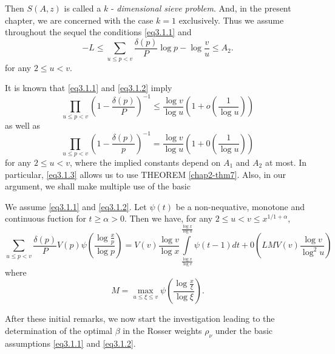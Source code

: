 Then $S(A,z)$ is called a $k$ - \textit{dimensional sieve
  problem}. And, in the present chapter, we are concerned with the
case $k =1$ exclusively. Thus we assume throughout the sequel the
conditions \eqref{eq3.1.1} and  
\begin{equation*}
 -L \le \sum_{u \le p < v} \frac{\delta(p)}{P} \log p - \log
 \frac{v}{u} \le A_2. \tag{3.1.2} \label{eq3.1.2}
\end{equation*}
for any $2 \le u < v$. 

It is known that \eqref{eq3.1.1} and \eqref{eq3.1.2} imply
\begin{equation*}
  \prod_{u \le p < v} \left(1 - \frac{\delta(p)}{P}\right)^{-1} \leq \frac{\log
    v}{\log u} \left(1 + o\left(\frac{1}{\log u}\right)\right)
  \tag{3.1.3} \label{eq3.1.3} 
\end{equation*} 
as well as\pageoriginale
\begin{equation*}
  \prod_{u \le p < v} \left(1 - \frac{\delta(p)}{p}\right)^{-1} = \frac{\log
    v}{\log u} \left(1 + 0 \left(\frac{1}{\log u}\right)\right)
  \tag{3.1.4} \label{eq3.1.4} 
\end{equation*}
 for any $2 \le u < v$, where the implied constants depend on $A_1$
 and $A_2$ at most. In particular, \eqref{eq3.1.3} allows us to use THEOREM
 \ref{chap2-thm7}. Also, in our argument, we shall make multiple use
 of the basic  

 \begin{Lemma}\label{chap3-lem11}%
   We assume \eqref{eq3.1.1} and \eqref{eq3.1.2}. Let $\psi(t)$ be a
   non-nequative, 
   monotone and continuous fuction for $t \ge \alpha > 0$. Then we have,
   for any $2 \le u < v \le x^{1/1+\alpha}$, 
   $$
     \sum_{u \le p < v} \frac{\delta(p)}{P} V(p)\psi \left(\frac{\log
       \frac{x}{p}}{\log p}\right) = V(v) \frac{\log v}{\log x} \int
     \limits^{\frac{\log x}{\log u}}_{\frac{\log x}{\log v}} \psi (t - 1)
     dt +  0(LMV(v) \frac{\log v}{\log^2 u})
$$
where
$$
M = \max \limits_{u \le \xi \le v}\psi \left(\frac{\log
       \frac{x}{\xi}}{\log \xi}\right).
$$
\end{Lemma} 

After these initial remarks, we now start the investigation leading to
the determination of the optimal $\beta$ in the Rosser weights
$\rho_\nu$ under the basic assumptions \eqref{eq3.1.1} and \eqref{eq3.1.2}. 

